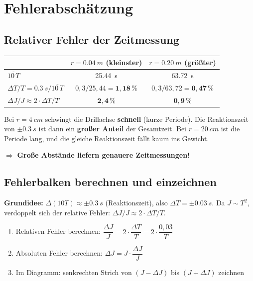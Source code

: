 \documentclass[11pt,a4paper]{scrartcl}
\begin{document}
\section*{Fehlerabschätzung}

\subsection*{Relativer Fehler der Zeitmessung}

\begin{center}
	\renewcommand{\arraystretch}{1.8}
	\begin{tabular}{|l|c|c|}
		\hline
		& \textbf{$r = \SI{0,04}{m}$} (kleinster) & \textbf{$r = \SI{0,20}{m}$} (größter) \\
		\hline
		$\overline{10\,T}$ & \SI{25,44}{s} & \SI{63,72}{s} \\
		\hline
		$\Delta T / T = \SI{0,3}{s} / \overline{10\,T}$ & $0{,}3 / 25{,}44 = \mathbf{1{,}18\,\%}$ & $0{,}3 / 63{,}72 = \mathbf{0{,}47\,\%}$ \\
		\hline
		$\Delta J / J \approx 2 \cdot \Delta T / T$ & $\mathbf{2{,}4\,\%}$ & $\mathbf{0{,}9\,\%}$ \\
		\hline
	\end{tabular}
\end{center}

\begin{infobox}[title={\faIcon{info-circle} Warum ist der Fehler bei kleinem $r$ größer?}]
	Bei $r = \SI{4}{cm}$ schwingt die Drillachse \textbf{schnell} (kurze Periode). Die Reaktionszeit von $\pm\SI{0,3}{s}$ ist dann ein \textbf{großer Anteil} der Gesamtzeit. Bei $r = \SI{20}{cm}$ ist die Periode lang, und die gleiche Reaktionszeit fällt kaum ins Gewicht.

	$\Rightarrow$ \textbf{Große Abstände liefern genauere Zeitmessungen!}
\end{infobox}

\subsection*{Fehlerbalken berechnen und einzeichnen}

\textbf{Grundidee:} $\Delta(10T) \approx \pm\SI{0,3}{s}$ (Reaktionszeit), also $\Delta T = \pm\SI{0,03}{s}$.
Da $J \sim T^2$, verdoppelt sich der relative Fehler: $\Delta J / J \approx 2 \cdot \Delta T / T$.

\begin{formelbox}[title={\faIcon{square-root-alt} Fehlerbalken für jeden Messpunkt}]
	\begin{enumerate}
		\item Relativen Fehler berechnen: $\dfrac{\Delta J}{J} = 2 \cdot \dfrac{\Delta T}{T} = 2 \cdot \dfrac{0{,}03}{T}$
		\item Absoluten Fehler berechnen: $\Delta J = J \cdot \dfrac{\Delta J}{J}$
		\item Im Diagramm: senkrechten Strich von $(J - \Delta J)$ bis $(J + \Delta J)$ zeichnen
	\end{enumerate}
\end{formelbox}
\end{document}
